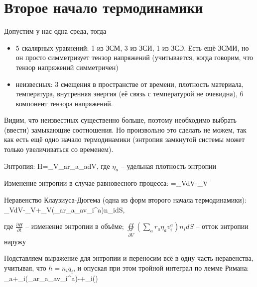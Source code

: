 \documentclass[main.tex]{subfiles}
\begin{document}
\newpage
\section{Второе начало термодинамики}

Допустим у нас одна среда, тогда

\begin{itemize}

\item 5 скалярных уравнений: 1 из ЗСМ, 3 из ЗСИ, 1 из ЗСЭ. Есть ещё ЗСМИ, но он просто симметризует тензор напряжений (учитывается, когда говорим, что тензор напряжений симметричен)

\item неизвесных: 3 смещения в пространстве от времени, плотность материала, температура, внутренняя энергия (её связь с температурой не очевидна), 6 компонент тензора напряжений.

\end{itemize}

Видим, что неизвестных существенно больше, поэтому необходимо выбрать (ввести) замыкающие соотношения. Но произвольно это сделать не можем, так как есть ещё одно начало термодинамики (энтропия замкнутой системы может только увеличиваться со временем).

Энтропия:
\beq
H=\iiint\limits_{V}{\sum\limits_{a}{r_a\eta_a}dV},
\eeq
где $\eta_a$ -- удельная плотность энтропии

Изменение энтропии в случае равновесного процесса:
\beq
{}=\iiint\limits_{V}dV-\oiint\limits_{\partial V}{}
\eeq

Неравенство Клаузиуса-Дюгема (одна из форм второго начала термодинамики):
\beq
\iiint\limits_{V}{dV}-\oiint\limits_{\partial V}\leq{}+\oiint\limits_{\partial V}\left(\sum\limits_{a}{r_a\eta_av_i^a}\right)n_idS,
\eeq

где $\displaystyle{}\frac{\partial H}{\partial t}$ -- изменение энтропии в объёме; $\displaystyle{}\oiint\limits_{\partial V}\left(\sum\limits_{a}{r_a\eta_av_i^a}\right)n_idS$ -- отток энтропии наружу

Подставляем выражение для энтропии и переносим всё в одну часть неравенства, учитывая, что $h=n_iq_i$, и опуская при этом тройной интеграл по лемме Римана:
\beq
\sum\limits_{a}{}+\partial_i\left(\sum\limits_{a}{r_a\eta_av_i^a}\right)-+\partial_i\left(\right)
\eeq
\end{document}
